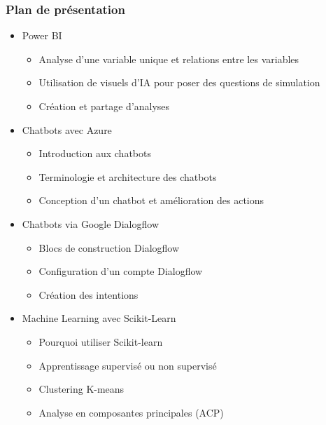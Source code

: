\documentclass{beamer}
\begin{document}
\begin{frame}
	\frametitle{Plan de présentation}
	\begin{itemize}
		\item Power BI

			\begin{itemize}
			\item Analyse d'une variable unique et relations entre les variables
			\item Utilisation de visuels d'IA pour poser des questions de simulation
			\item Création et partage d'analyses
		\end{itemize}

		\item Chatbots avec Azure
			\begin{itemize}
			\item Introduction aux chatbots
			\item Terminologie et architecture des chatbots
			\item Conception d'un chatbot et amélioration des actions
		\end{itemize}
		\item Chatbots via Google Dialogflow
			\begin{itemize}
			\item Blocs de construction Dialogflow
			\item Configuration d'un compte Dialogflow
			\item Création des intentions
		\end{itemize}
		\item Machine Learning avec Scikit-Learn
			\begin{itemize}
			\item Pourquoi utiliser Scikit-learn
			\item Apprentissage supervisé ou non supervisé
			\item Clustering K-means
			\item Analyse en composantes principales (ACP)
		\end{itemize}
	\end{itemize}
\end{frame}
\end{document}
